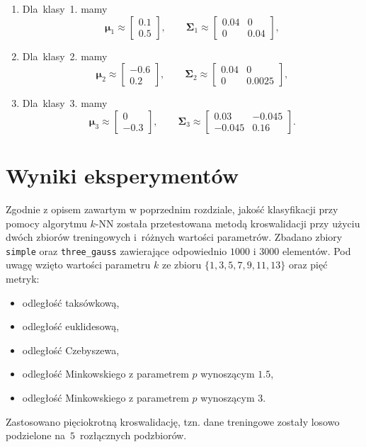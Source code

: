 \documentclass[11pt,a4paper]{article}
\begin{document}
\begin{enumerate}
    \item Dla~klasy~1. mamy
    $$
        \boldsymbol\mu_1 \approx \begin{bmatrix} 0.1 \\ 0.5 \end{bmatrix},
        \qquad
        \boldsymbol\Sigma_1 \approx \begin{bmatrix} 0.04 & 0 \\ 0 & 0.04 \end{bmatrix},
    $$
    \item Dla~klasy~2. mamy
    $$
        \boldsymbol\mu_2 \approx \begin{bmatrix} -0.6 \\ 0.2 \end{bmatrix},
        \qquad
        \boldsymbol\Sigma_2 \approx \begin{bmatrix} 0.04 & 0 \\ 0 & 0.0025 \end{bmatrix},
    $$
    \item Dla~klasy~3. mamy
    $$
        \boldsymbol\mu_3 \approx \begin{bmatrix} 0 \\ -0.3 \end{bmatrix},
        \qquad
        \boldsymbol\Sigma_3 \approx \begin{bmatrix} 0.03 & -0.045 \\ -0.045 & 0.16 \end{bmatrix}.
    $$
\end{enumerate}


\section{Wyniki eksperymentów}

Zgodnie z opisem zawartym w poprzednim rozdziale, jakość klasyfikacji przy pomocy algorytmu $k$-NN została przetestowana metodą kroswalidacji przy użyciu dwóch zbiorów treningowych i~różnych wartości parametrów. Zbadano zbiory {\tt simple} oraz {\tt three\_gauss} zawierające odpowiednio $1000$ i $3000$ elementów. Pod uwagę wzięto wartości parametru $k$ ze zbioru $\{1, 3, 5, 7, 9, 11, 13\}$ oraz pięć metryk:
\begin{itemize}
    \setlength\itemsep{-.4em}
    \item odległość taksówkową,
    \item odległość euklidesową,
    \item odległość Czebyszewa,
    \item odległość Minkowskiego z parametrem $p$ wynoszącym $1.5$,
    \item odległość Minkowskiego z parametrem $p$ wynoszącym $3$.
\end{itemize}
Zastosowano pięciokrotną kroswalidację, tzn. dane treningowe zostały losowo podzielone na~$5$~rozłącznych podzbiorów. %
\end{document}

